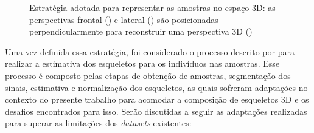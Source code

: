 \begin{figure}[ht!]
    \centering
    \caption{\textmd{Estratégia adotada para representar as amostras no espaço 3D: as perspectivas frontal () e lateral () são posicionadas perpendicularmente para reconstruir uma perspectiva 3D ()}}
    \nomefonte{}
    \label{fig:our-strategy-3d}
\end{figure}


Uma vez definida essa estratégia, foi considerado o processo descrito por  para realizar a estimativa dos esqueletos para os indivíduos nas amostras. Esse processo é composto pelas etapas de obtenção de amostras, segmentação dos sinais, estimativa e normalização dos esqueletos, as quais sofreram adaptações no contexto do presente trabalho para acomodar a composição de esqueletos 3D e os desafios encontrados para isso. Serão discutidas a seguir as adaptações realizadas para superar as limitações dos \textit{datasets} existentes:

